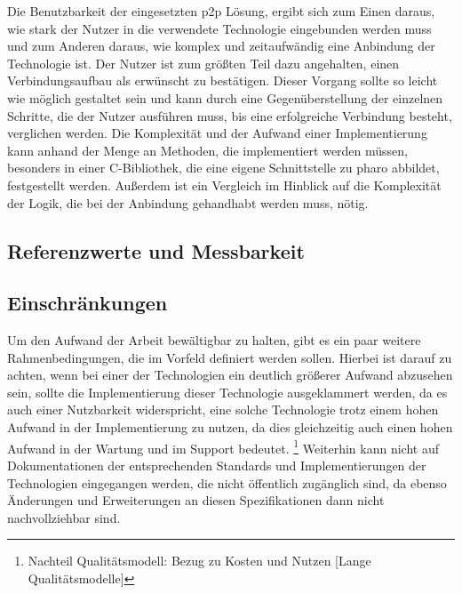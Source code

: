 \begin{enumerate}
    	Die Benutzbarkeit der eingesetzten p2p Lösung, ergibt sich zum Einen daraus, wie stark der Nutzer in die verwendete Technologie eingebunden werden muss und zum Anderen daraus, wie komplex und zeitaufwändig eine Anbindung der Technologie ist.
    	Der Nutzer ist zum größten Teil dazu angehalten, einen Verbindungsaufbau als erwünscht zu bestätigen. Dieser Vorgang sollte so leicht wie möglich gestaltet sein und kann durch eine Gegenüberstellung der einzelnen Schritte, die der Nutzer ausführen muss, bis eine erfolgreiche Verbindung besteht, verglichen werden.
    	Die Komplexität und der Aufwand einer Implementierung kann anhand der Menge an Methoden, die implementiert werden müssen, besonders in einer C-Bibliothek, die eine eigene Schnittstelle zu pharo abbildet, festgestellt werden. Außerdem ist ein Vergleich im Hinblick auf die Komplexität der Logik, die bei der Anbindung gehandhabt werden muss, nötig.
    	\end{enumerate}
    	\subsection{Referenzwerte und Messbarkeit}

		\subsection{Einschränkungen}
		Um den Aufwand der Arbeit bewältigbar zu halten, gibt es ein paar weitere Rahmenbedingungen, die im Vorfeld definiert werden sollen. Hierbei ist darauf zu achten, wenn bei einer der Technologien ein deutlich größerer Aufwand abzusehen sein, sollte die Implementierung dieser Technologie ausgeklammert werden, da es auch einer Nutzbarkeit widerspricht, eine solche Technologie trotz einem hohen Aufwand in der Implementierung zu nutzen, da dies gleichzeitig auch einen hohen Aufwand in der Wartung und im Support bedeutet. \footnote{Nachteil Qualitätsmodell: Bezug zu Kosten und Nutzen [Lange Qualitätsmodelle]}
		Weiterhin kann nicht auf Dokumentationen der entsprechenden Standards und Implementierungen der Technologien eingegangen werden, die nicht öffentlich zugänglich sind, da ebenso Änderungen und Erweiterungen an diesen Spezifikationen dann nicht nachvollziehbar sind.
